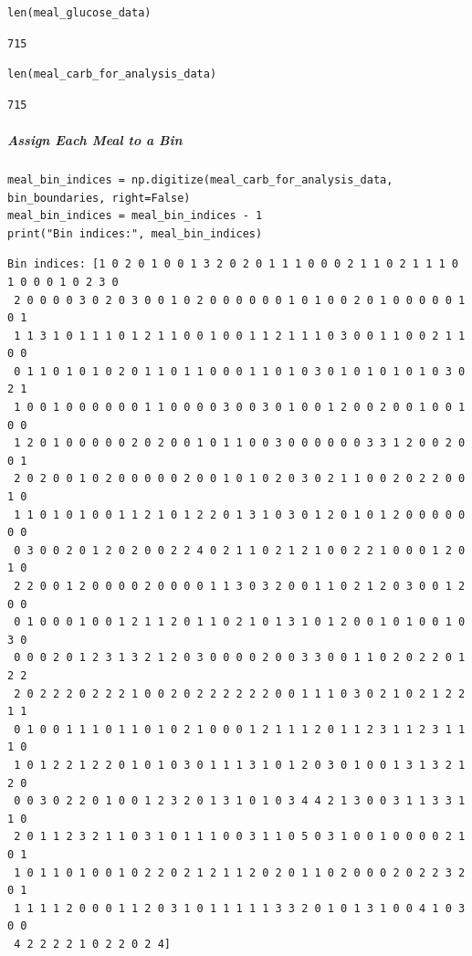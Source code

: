 \begin{verbatim}
len(meal_glucose_data)
\end{verbatim}

\begin{verbatim}
715
\end{verbatim}

\begin{verbatim}
len(meal_carb_for_analysis_data)
\end{verbatim}

\begin{verbatim}
715
\end{verbatim}

\subparagraph{Assign Each Meal to a Bin}

\begin{verbatim}
meal_bin_indices = np.digitize(meal_carb_for_analysis_data, bin_boundaries, right=False)
meal_bin_indices = meal_bin_indices - 1
print("Bin indices:", meal_bin_indices)
\end{verbatim}

\begin{verbatim}
Bin indices: [1 0 2 0 1 0 0 1 3 2 0 2 0 1 1 1 0 0 0 2 1 1 0 2 1 1 1 0 1 0 0 0 1 0 2 3 0
 2 0 0 0 0 3 0 2 0 3 0 0 1 0 2 0 0 0 0 0 0 1 0 1 0 0 2 0 1 0 0 0 0 0 1 0 1
 1 1 3 1 0 1 1 1 0 1 2 1 1 0 0 1 0 0 1 1 2 1 1 1 0 3 0 0 1 1 0 0 2 1 1 0 0
 0 1 1 0 1 0 1 0 2 0 1 1 0 1 1 0 0 0 1 1 0 1 0 3 0 1 0 1 0 1 0 1 0 3 0 2 1
 1 0 0 1 0 0 0 0 0 0 1 1 0 0 0 0 3 0 0 3 0 1 0 0 1 2 0 0 2 0 0 1 0 0 1 0 0
 1 2 0 1 0 0 0 0 0 2 0 2 0 0 1 0 1 1 0 0 3 0 0 0 0 0 0 3 3 1 2 0 0 2 0 0 1
 2 0 2 0 0 1 0 2 0 0 0 0 0 2 0 0 1 0 1 0 2 0 3 0 2 1 1 0 0 2 0 2 2 0 0 1 0
 1 1 0 1 0 1 0 0 1 1 2 1 0 1 2 2 0 1 3 1 0 3 0 1 2 0 1 0 1 2 0 0 0 0 0 0 0
 0 3 0 0 2 0 1 2 0 2 0 0 2 2 4 0 2 1 1 0 2 1 2 1 0 0 2 2 1 0 0 0 1 2 0 1 0
 2 2 0 0 1 2 0 0 0 0 2 0 0 0 0 1 1 3 0 3 2 0 0 1 1 0 2 1 2 0 3 0 0 1 2 0 0
 0 1 0 0 0 1 0 0 1 2 1 1 2 0 1 1 0 2 1 0 1 3 1 0 1 2 0 0 1 0 1 0 0 1 0 3 0
 0 0 0 2 0 1 2 3 1 3 2 1 2 0 3 0 0 0 0 2 0 0 3 3 0 0 1 1 0 2 0 2 2 0 1 2 2
 2 0 2 2 2 0 2 2 2 1 0 0 2 0 2 2 2 2 2 2 0 0 1 1 1 0 3 0 2 1 0 2 1 2 2 1 1
 0 1 0 0 1 1 1 0 1 1 0 1 0 2 1 0 0 0 1 2 1 1 1 2 0 1 1 2 3 1 1 2 3 1 1 1 0
 1 0 1 2 2 1 2 2 0 1 0 1 0 3 0 1 1 1 3 1 0 1 2 0 3 0 1 0 0 1 3 1 3 2 1 2 0
 0 0 3 0 2 2 0 1 0 0 1 2 3 2 0 1 3 1 0 1 0 3 4 4 2 1 3 0 0 3 1 1 3 3 1 1 0
 2 0 1 1 2 3 2 1 1 0 3 1 0 1 1 1 0 0 3 1 1 0 5 0 3 1 0 0 1 0 0 0 0 2 1 0 1
 1 0 1 1 0 1 0 0 1 0 2 2 0 2 1 2 1 1 2 0 2 0 1 1 0 2 0 0 0 2 0 2 2 3 2 0 1
 1 1 1 1 2 0 0 0 1 1 2 0 3 1 0 1 1 1 1 1 3 3 2 0 1 0 1 3 1 0 0 4 1 0 3 0 0
 4 2 2 2 2 1 0 2 2 0 2 4]
\end{verbatim}


